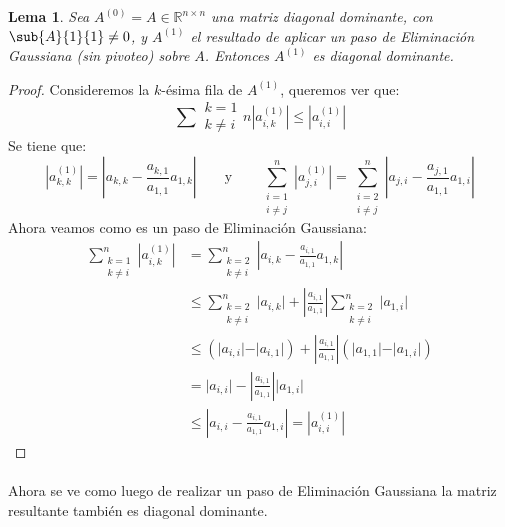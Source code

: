 \documentclass[12pt]{article}
\newtheorem{lema}{Lema}
\begin{document}
\begin{lema}
\label{lema:EG conserva diagonal dominante}
Sea \(A^{(0)} = A \in \mathbb{R}^{n \times n}\) una matriz diagonal dominante, con \(\sub{A}{1}{1} \neq 0\), y \(A^{(1)}\) el resultado de aplicar un paso de Eliminación Gaussiana (sin pivoteo) sobre \(A\). Entonces \(A^{(1)}\) es diagonal dominante.
\end{lema}
\begin{proof}
Consideremos la \(k\)-ésima fila de \(A^{(1)}\), queremos ver que:
\[
  \sum{\substack{k = 1 \\ k \neq i}}{n} |a^{(1)}_{i,k}| \leq |a^{(1)}_{i,i} |
\]
Se tiene que:
\[
  | a^{(1)}_{k,k} | = | a_{k,k} - \frac{a_{k,1}}{a_{1,1}} a_{1,k} |
  \qquad \text{y} \qquad
  \sum_{\substack{i = 1 \\ i \neq j}}^n | a^{(1)}_{j,i} |
= \sum_{\substack{i = 2 \\ i \neq j}}^n | a_{j,i} - \frac{a_{j,1}}{a_{1,1}} a_{1,i} |
\]
Ahora veamos como es un paso de Eliminación Gaussiana:
\[\begin{split}
  \sum_{\substack{k = 1 \\ k \neq i}}^n | a^{(1)}_{i,k} | & = \sum_{\substack{k = 2 \\ k \neq i}}^n | a_{i,k} - \frac{a_{i,1}}{a_{1,1}} a_{1,k} | \\
                                                          & \leq \sum_{\substack{k = 2 \\ k \neq i}}^n \vert a_{i,k} \vert + \left \vert \frac{a_{i,1}}{a_{1,1}} \right \vert \sum_{\substack{k = 2 \\ k \neq i}}^n \vert a_{1,i} \vert \\
                                                          & \leq \left( \vert a_{i,i} \vert - \vert a_{i,1} \vert \right) + \left \vert \frac{a_{i,1}}{a_{1,1}} \right \vert \left( \vert a_{1,1} \vert - \vert a_{1,i} \vert \right) \\
                                                          & = \vert a_{i,i} \vert - \left \vert \frac{a_{i,1}}{a_{1,1}} \right \vert \vert a_{1,i} \vert \\
                                                          & \leq \left \vert a_{i,i} -  \frac{a_{i,1}}{a_{1,1}} a_{1,i} \right \vert = | a^{(1)}_{i,i} | 
\end{split}\]
\end{proof}

\paragraph{} Ahora se ve como luego de realizar un paso de Eliminación Gaussiana la matriz resultante también es diagonal dominante.
\end{document}
